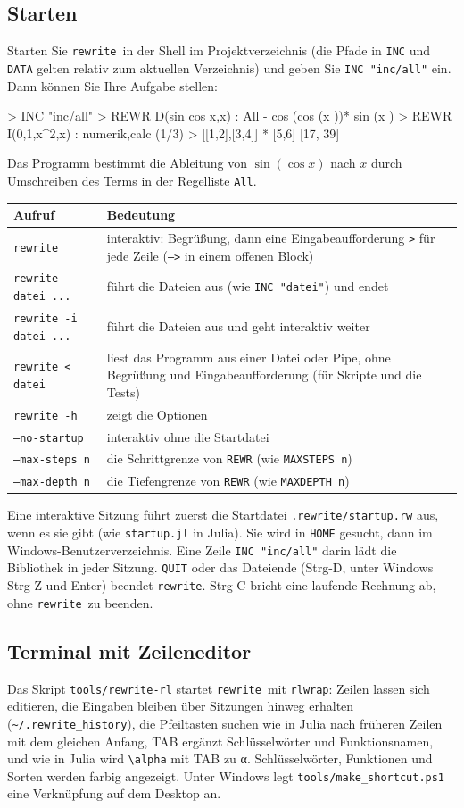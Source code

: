 \documentclass[a4paper,11pt]{article}
\newcommand{\rw}{\texttt{rewrite}}
\newcommand{\kw}[1]{\texttt{#1}}
\begin{document}
\subsection{Starten}
Starten Sie \rw\ in der Shell im Projektverzeichnis (die Pfade in
\kw{INC} und \kw{DATA} gelten relativ zum aktuellen Verzeichnis) und
geben Sie \kw{INC "inc/all"} ein. Dann können Sie Ihre Aufgabe stellen:
\begin{beispiel}
> INC "inc/all"
> REWR D(sin cos x,x) : All
- cos (cos (x ))* sin (x )
> REWR I(0,1,x^2,x) : numerik,calc
(1/3)
> [[1,2],[3,4]] * [5,6]
[17,
 39]
\end{beispiel}
Das Programm bestimmt die Ableitung von $\sin(\cos x)$ nach $x$ durch
Umschreiben des Terms in der Regelliste \kw{All}.

\medskip
\noindent
\begin{tabularx}{\textwidth}{@{}lX@{}}
\toprule
Aufruf & Bedeutung \\
\midrule
\kw{rewrite} & interaktiv: Begrüßung, dann eine Eingabeaufforderung
  \kw{>} für jede Zeile (\kw{-->} in einem offenen Block) \\
\kw{rewrite datei ...} & führt die Dateien aus (wie \kw{INC "datei"}) und endet \\
\kw{rewrite -i datei ...} & führt die Dateien aus und geht interaktiv weiter \\
\kw{rewrite < datei} & liest das Programm aus einer Datei oder Pipe, ohne
  Begrüßung und Eingabeaufforderung (für Skripte und die Tests) \\
\kw{rewrite -h} & zeigt die Optionen \\
\kw{--no-startup} & interaktiv ohne die Startdatei \\
\kw{--max-steps n} & die Schrittgrenze von \kw{REWR} (wie \kw{MAXSTEPS n}) \\
\kw{--max-depth n} & die Tiefengrenze von \kw{REWR} (wie \kw{MAXDEPTH n}) \\
\bottomrule
\end{tabularx}

\medskip
Eine interaktive Sitzung führt zuerst die Startdatei
\kw{.rewrite/startup.rw} aus, wenn es sie gibt (wie \kw{startup.jl} in
Julia). Sie wird in \kw{HOME} gesucht, dann im Windows-Benutzerverzeichnis.
Eine Zeile \kw{INC "inc/all"} darin lädt die Bibliothek in jeder Sitzung.
\kw{QUIT} oder das Dateiende (Strg-D, unter Windows Strg-Z und Enter)
beendet \rw. Strg-C bricht eine laufende Rechnung ab, ohne \rw\ zu
beenden.

\subsection{Terminal mit Zeileneditor}
Das Skript \kw{tools/rewrite-rl} startet \rw\ mit \kw{rlwrap}: Zeilen
lassen sich editieren, die Eingaben bleiben über Sitzungen hinweg erhalten
(\kw{\textasciitilde/.rewrite\_history}), die Pfeiltasten suchen wie in
Julia nach früheren Zeilen mit dem gleichen Anfang, TAB ergänzt
Schlüsselwörter und Funktionsnamen, und wie in Julia wird \verb|\alpha|
mit TAB zu α. Schlüsselwörter, Funktionen und Sorten werden farbig
angezeigt. Unter Windows legt \kw{tools/make\_shortcut.ps1} eine
Verknüpfung auf dem Desktop an.
\end{document}
